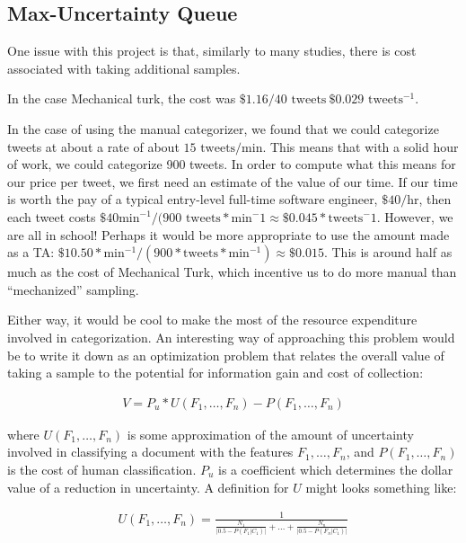 \documentclass[12pt,a4paper]{article}
\begin{document}
\subsection { Max-Uncertainty Queue }

One issue with this project is that, similarly to many studies, there is cost associated with taking additional samples.

In the case Mechanical turk, the cost was $ \$1.16 / 40 \text{ tweets} ~ \$0.029 \text{ tweets}^{-1}$. 


In the case of using the manual categorizer, we found that we could categorize tweets at about a rate of about $ 15 \text{ tweets} / \text{min} $.  This means that with a solid hour of work, we could categorize 900 tweets.  In order to compute what this means for our price per tweet, we first need an estimate of the value of our time.  If our time is worth the pay of a typical entry-level full-time software engineer, $ \$40 / \text{hr} $, then each tweet costs $ \$40 \text{min}^{-1} / ( 900 \text{ tweets} * \text{min}^-1 \approx \$0.045 * \text{tweets}^-1 $.  However, we are all in school!  Perhaps it would be more appropriate to use the amount made as a TA: $ \$10.50 * \text{min}^{-1} / ( 900 * \text{tweets} * \text{min}^{-1} ) \approx \$0.015 $.  This is around half as much as the cost of Mechanical Turk, which incentive us to do more manual than ``mechanized'' sampling.

Either way, it would be cool to make the most of the resource expenditure involved in categorization.  An interesting way of approaching this problem would be to write it down as an optimization problem that relates the overall value of taking a sample to the potential for information gain and cost of collection:

\begin{align*}
V = P_u * U(F_1,\dots,F_n) - P(F_1,\dots,F_n)
\end{align*}

where $ U(F_1,\dots,F_n) $ is some approximation of the amount of uncertainty involved in classifying a document with the features $ F_1,\dots,F_n $, and $ P(F_1,\dots,F_n) $ is the cost of human classification.  $ P_u $ is a coefficient which determines the dollar value of a reduction in uncertainty.  A definition for $ U $ might looks something like:

\begin{align*}
U(F_1,\dots,F_n) = \frac {1} {\frac{N_1}{\vert 0.5 - P(F_1 \vert C_1) \vert} + \dots + \frac{N_n}{\vert 0.5 - P(F_n \vert C_1) \vert}}
\end{align*}
\end{document}
